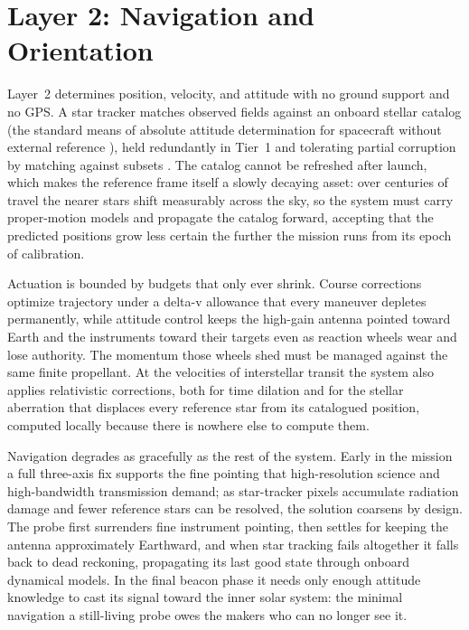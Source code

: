\documentclass[10pt, a4paper]{article}
\begin{document}
\section{Layer 2: Navigation and Orientation}

Layer~2 determines position, velocity, and attitude with no ground support and no GPS. A star tracker matches observed fields against an onboard stellar catalog (the standard means of absolute attitude determination for spacecraft without external reference \cite{liebe1995}), held redundantly in Tier~1 and tolerating partial corruption by matching against subsets \cite{gaia2016}. The catalog cannot be refreshed after launch, which makes the reference frame itself a slowly decaying asset: over centuries of travel the nearer stars shift measurably across the sky, so the system must carry proper-motion models and propagate the catalog forward, accepting that the predicted positions grow less certain the further the mission runs from its epoch of calibration.

Actuation is bounded by budgets that only ever shrink. Course corrections optimize trajectory under a delta-v allowance that every maneuver depletes permanently, while attitude control keeps the high-gain antenna pointed toward Earth and the instruments toward their targets even as reaction wheels wear and lose authority. The momentum those wheels shed must be managed against the same finite propellant. At the velocities of interstellar transit the system also applies relativistic corrections, both for time dilation and for the stellar aberration that displaces every reference star from its catalogued position, computed locally because there is nowhere else to compute them.

Navigation degrades as gracefully as the rest of the system. Early in the mission a full three-axis fix supports the fine pointing that high-resolution science and high-bandwidth transmission demand; as star-tracker pixels accumulate radiation damage and fewer reference stars can be resolved, the solution coarsens by design. The probe first surrenders fine instrument pointing, then settles for keeping the antenna approximately Earthward, and when star tracking fails altogether it falls back to dead reckoning, propagating its last good state through onboard dynamical models. In the final beacon phase it needs only enough attitude knowledge to cast its signal toward the inner solar system: the minimal navigation a still-living probe owes the makers who can no longer see it.
\end{document}
